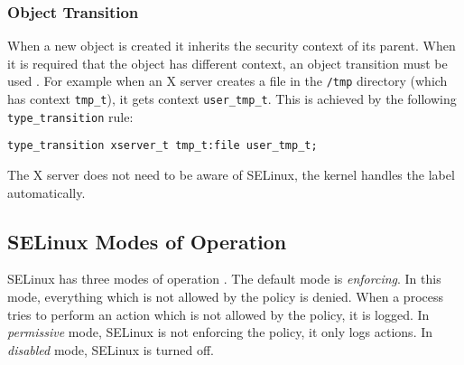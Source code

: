 \subsubsection{Object Transition}
When a new object is created it inherits the security context of its parent.
When it is required that the object has different context, an object transition
must be used \cite[pp.~47--48]{tsn}. For example when an X server creates a file
in the \texttt{/tmp} directory (which has context \texttt{tmp\_t}), it gets
context \texttt{user\_tmp\_t}. This is achieved by the following
\texttt{type\_transition} rule:
\begin{lstlisting}[language=te]
type_transition xserver_t tmp_t:file user_tmp_t;
\end{lstlisting}
The X server does not need to be aware of SELinux, the kernel handles the label
automatically.

\subsection{SELinux Modes of Operation}

SELinux has three modes of operation \cite{selinuxguide}. The default mode is
\emph{enforcing}. In this mode, everything which is not allowed by the policy is
denied. When a process tries to perform an action which is not allowed by the
policy, it is logged. In \emph{permissive} mode, SELinux is not enforcing the
policy, it only logs actions. In \emph{disabled} mode, SELinux is turned off.

